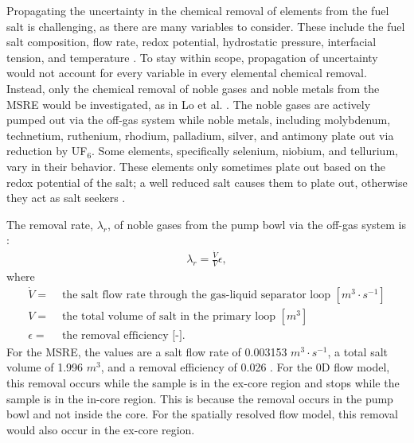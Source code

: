 Propagating the uncertainty in the chemical removal of elements from the fuel salt is challenging, as there are many variables to consider.
These include the fuel salt composition, flow rate, redox potential, hydrostatic pressure, interfacial tension, and temperature \cite{shahbazi2022survey, thoma1971chemical}.
To stay within scope, propagation of uncertainty would not account for every variable in every elemental chemical removal.
Instead, only the chemical removal of noble gases and noble metals from the \gls{MSRE} would be investigated, as in Lo et al. \cite{lo2022application}.
The noble gases are actively pumped out via the off-gas system while noble metals, including molybdenum, technetium, ruthenium, rhodium, palladium, silver, and antimony plate out via reduction by UF$_6$.
Some elements, specifically selenium, niobium, and tellurium, vary in their behavior.
These elements only sometimes plate out based on the redox potential of the salt; a well reduced salt causes them to plate out, otherwise they act as salt seekers \cite{kedl1972migration, lo2022application}.

The removal rate, $\lambda_r$, of noble gases from the pump bowl via the off-gas system is \cite{jr2020modeling, lo2022application}:
\begin{align}
    \lambda_r = \frac{\dot{V}}{V} \epsilon,
\end{align}
where
\begin{align}
    \dot{V} =& \text{ the salt flow rate through the gas-liquid separator loop $[m^3 \cdot s^{-1}]$} \nonumber \\
    V =& \text{ the total volume of salt in the primary loop $[m^3]$} \nonumber \\
    \epsilon =& \text{ the removal efficiency [-]}. \nonumber
\end{align}
For the \gls{MSRE}, the values are a salt flow rate of 0.003153 $m^3 \cdot s^{-1}$, a total salt volume of 1.996 $m^3$, and a removal efficiency of 0.026 \cite{jr2020modeling, robertson1965msre}.
For the 0D flow model, this removal occurs while the sample is in the ex-core region and stops while the sample is in the in-core region.
This is because the removal occurs in the pump bowl and not inside the core.
For the spatially resolved flow model, this removal would also occur in the ex-core region.

